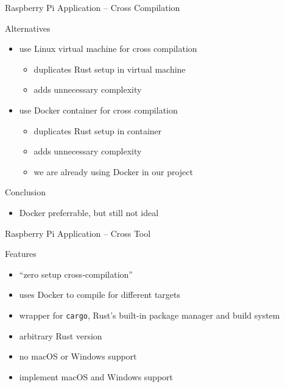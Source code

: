 \begin{frame}{Raspberry Pi Application -- Cross Compilation}
  \begin{block}{Alternatives}
    \begin{itemize}
      \item use Linux virtual machine for cross compilation
      \begin{itemize}
        \item {} duplicates Rust setup in virtual machine
        \item {} adds unnecessary complexity
      \end{itemize}
      \item use Docker container for cross compilation
      \begin{itemize}
        \item {} duplicates Rust setup in container
        \item {} adds unnecessary complexity
        \item {} we are already using Docker in our project
      \end{itemize}
    \end{itemize}
  \end{block}

   {
  \begin{block}{Conclusion}
    \begin{itemize}
      \item Docker preferrable, but still not ideal
    \end{itemize}
  \end{block}
  }
\end{frame}

\begin{frame}{Raspberry Pi Application -- Cross Tool}
  \begin{block}{Features}
    \begin{itemize}
      \item “zero setup cross-compilation”
      \item uses Docker to compile for different targets
      \item wrapper for \texttt{cargo}, Rust's built-in package manager and build system
      \item arbitrary Rust version
    \end{itemize}
  \end{block}

   {
  \begin{block}{}
    \begin{itemize}
      \item no macOS or Windows support
    \end{itemize}
  \end{block}
  }

   {
  \begin{block}{}
    \begin{itemize}
      \item implement macOS and Windows support
    \end{itemize}
  \end{block}
  }
\end{frame}

